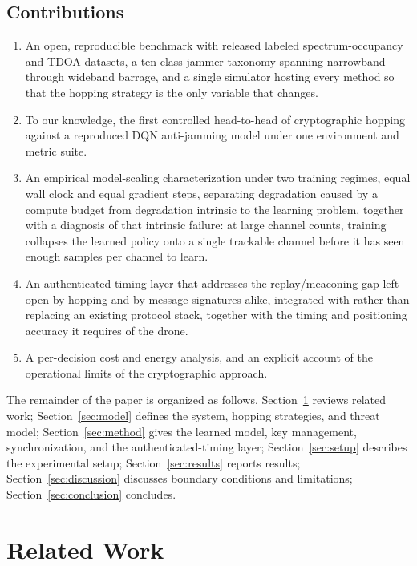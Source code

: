 \documentclass[journal]{IEEEtran}
\begin{document}
\subsection{Contributions}
\begin{enumerate}
\item An open, reproducible benchmark with released labeled
spectrum-occupancy and TDOA datasets, a ten-class jammer taxonomy spanning
narrowband through wideband barrage, and a single simulator hosting every
method so that the hopping strategy is the only variable that changes.
\item To our knowledge, the first controlled head-to-head of cryptographic hopping against a
reproduced DQN anti-jamming model under one environment and metric suite.
\item An empirical model-scaling characterization under two training regimes,
equal wall clock and equal gradient steps, separating degradation caused by a
compute budget from degradation intrinsic to the learning problem, together
with a diagnosis of that intrinsic failure: at large channel counts, training
collapses the learned policy onto a single trackable channel before it has
seen enough samples per channel to learn.
\item An authenticated-timing layer that addresses the replay/meaconing gap left
open by hopping and by message signatures alike, integrated with rather than
replacing an existing protocol stack, together with the timing and positioning
accuracy it requires of the drone.
\item A per-decision cost and energy analysis, and an explicit account of the
operational limits of the cryptographic approach.
\end{enumerate}

The remainder of the paper is organized as follows.
Section~\ref{sec:lit} reviews related work; Section~\ref{sec:model} defines the
system, hopping strategies, and threat model; Section~\ref{sec:method} gives the
learned model, key management, synchronization, and the authenticated-timing
layer; Section~\ref{sec:setup} describes the experimental setup;
Section~\ref{sec:results} reports results; Section~\ref{sec:discussion}
discusses boundary conditions and limitations; Section~\ref{sec:conclusion}
concludes.

\section{Related Work}\label{sec:lit}
\end{document}
